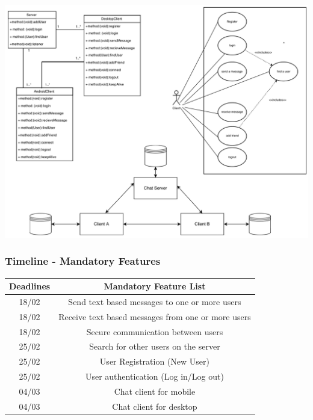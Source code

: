 \documentclass[11pt,compress,xcolor={usenames,dvipsnames}]{beamer}
\begin{document}
\begin{frame}
\frametitle{}
\centering
\includegraphics[scale=0.5]{UMLdiagrams.png}
\end{frame}

\begin{frame}
\frametitle{Timeline - Mandatory Features}
\begin {table}[H]
\begin{center}
\begin{tabular}{|c|c|}
\hline 
\rule[-1ex]{0pt}{2.5ex} \textbf{Deadlines} & \textbf{Mandatory Feature List} \\ 
\hline 
\rule[-1ex]{0pt}{2.5ex} 18/02 & Send text based messages to one or more users \\ 
\hline 
\rule[-1ex]{0pt}{2.5ex} 18/02 & Receive text based messages from one or more users \\ 
\hline 
\rule[-1ex]{0pt}{2.5ex} 18/02 & Secure communication between users \\ 
\hline 
\rule[-1ex]{0pt}{2.5ex} 25/02 & Search for other users on the server \\ 
\hline 
\rule[-1ex]{0pt}{2.5ex} 25/02 & User Registration (New User) \\ 
\hline 
\rule[-1ex]{0pt}{2.5ex} 25/02 & User authentication (Log in/Log out) \\ 
\hline 
\rule[-1ex]{0pt}{2.5ex} 04/03 & Chat client for mobile \\ 
\hline 
\rule[-1ex]{0pt}{2.5ex} 04/03 & Chat client for desktop \\ 
\hline 
\end{tabular} 
\end{center}
\end {table}
\end{frame}
\end{document}
